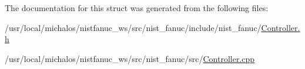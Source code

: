 The documentation for this struct was generated from the following files\-:\begin{DoxyCompactItemize}
\item 
/usr/local/michalos/nistfanuc\-\_\-ws/src/nist\-\_\-fanuc/include/nist\-\_\-fanuc/\hyperlink{Controller_8h}{Controller.\-h}\item 
/usr/local/michalos/nistfanuc\-\_\-ws/src/nist\-\_\-fanuc/src/\hyperlink{Controller_8cpp}{Controller.\-cpp}\end{DoxyCompactItemize}
